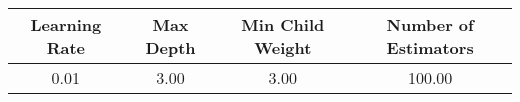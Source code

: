 \footnotesize
\begin{tabular}{cccc}
\toprule
Learning Rate & Max Depth & Min Child Weight & Number of Estimators \\
\midrule
0.01 & 3.00 & 3.00 & 100.00 \\
\bottomrule
\end{tabular}

\normalsize